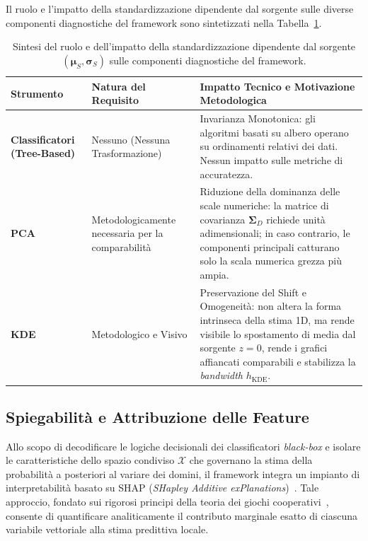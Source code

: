 Il ruolo e l'impatto della standardizzazione dipendente dal sorgente sulle diverse componenti diagnostiche del framework sono sintetizzati nella Tabella~\ref{tab:confronto_scaling_pca_kde}.

\begin{table}[H]
    \centering
    \small
    \caption{Sintesi del ruolo e dell'impatto della standardizzazione dipendente dal sorgente $(\boldsymbol{\mu}_S, \boldsymbol{\sigma}_S)$ sulle componenti diagnostiche del framework.}
    \label{tab:confronto_scaling_pca_kde}
    \begin{tabularx}{\textwidth}{>{\raggedright\arraybackslash}p{2.5cm} >{\raggedright\arraybackslash}p{4cm} >{\raggedright\arraybackslash}X }
        \toprule
        \textbf{Strumento}  & \textbf{Natura del Requisito} & \textbf{Impatto Tecnico e Motivazione Metodologica} \\
        \midrule
        \textbf{Classificatori (Tree-Based)} &
        Nessuno (Nessuna Trasformazione) &
        Invarianza Monotonica: gli algoritmi basati su albero operano su ordinamenti relativi dei dati. Nessun impatto sulle metriche di accuratezza. \\
        \addlinespace
        \textbf{PCA} &
        Metodologicamente necessaria per la comparabilità &
        Riduzione della dominanza delle scale numeriche: la matrice di covarianza $\boldsymbol{\Sigma}_D$ richiede unità adimensionali; in caso contrario, le componenti principali catturano solo la scala numerica grezza più ampia. \\
        \addlinespace
        \textbf{KDE} &
        Metodologico e Visivo &
        Preservazione del Shift e Omogeneità: non altera la forma intrinseca della stima 1D, ma rende visibile lo spostamento di media dal sorgente $z=0$, rende i grafici affiancati comparabili e stabilizza la \textit{bandwidth} $h_{\text{KDE}}$. \\
        \bottomrule
    \end{tabularx}
\end{table}

\subsection{Spiegabilità e Attribuzione delle Feature}
\label{subsec:spiegabilita_shap}

Allo scopo di decodificare le logiche decisionali dei classificatori \textit{black-box} e isolare le caratteristiche dello spazio condiviso $\mathcal{X}$ che governano la stima della probabilità a posteriori al variare dei domini, il framework integra un impianto di interpretabilità basato su SHAP (\textit{SHapley Additive exPlanations})~\cite{lundberg2017}. Tale approccio, fondato sui rigorosi principi della teoria dei giochi cooperativi~\cite{shapley1953}, consente di quantificare analiticamente il contributo marginale esatto di ciascuna variabile vettoriale alla stima predittiva locale.

